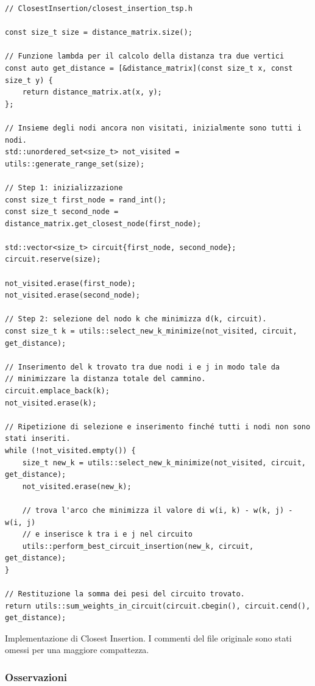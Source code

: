 \begin{listing}[!ht]
\begin{verbatim}
// ClosestInsertion/closest_insertion_tsp.h

const size_t size = distance_matrix.size();

// Funzione lambda per il calcolo della distanza tra due vertici
const auto get_distance = [&distance_matrix](const size_t x, const size_t y) {
    return distance_matrix.at(x, y);
};

// Insieme degli nodi ancora non visitati, inizialmente sono tutti i nodi.
std::unordered_set<size_t> not_visited = utils::generate_range_set(size);

// Step 1: inizializzazione
const size_t first_node = rand_int();
const size_t second_node = distance_matrix.get_closest_node(first_node);

std::vector<size_t> circuit{first_node, second_node};
circuit.reserve(size);

not_visited.erase(first_node);
not_visited.erase(second_node);

// Step 2: selezione del nodo k che minimizza d(k, circuit).
const size_t k = utils::select_new_k_minimize(not_visited, circuit, get_distance);

// Inserimento del k trovato tra due nodi i e j in modo tale da
// minimizzare la distanza totale del cammino.
circuit.emplace_back(k);
not_visited.erase(k);

// Ripetizione di selezione e inserimento finché tutti i nodi non sono stati inseriti.
while (!not_visited.empty()) {
    size_t new_k = utils::select_new_k_minimize(not_visited, circuit, get_distance);
    not_visited.erase(new_k);

    // trova l'arco che minimizza il valore di w(i, k) - w(k, j) - w(i, j)
    // e inserisce k tra i e j nel circuito
    utils::perform_best_circuit_insertion(new_k, circuit, get_distance);
}

// Restituzione la somma dei pesi del circuito trovato.
return utils::sum_weights_in_circuit(circuit.cbegin(), circuit.cend(), get_distance);
\end{verbatim}
\caption{Implementazione di Closest Insertion. I commenti del file originale sono stati omessi per una maggiore compattezza.}
\label{listing:closest-insertion}
\end{listing}

\subsubsection{Osservazioni}

